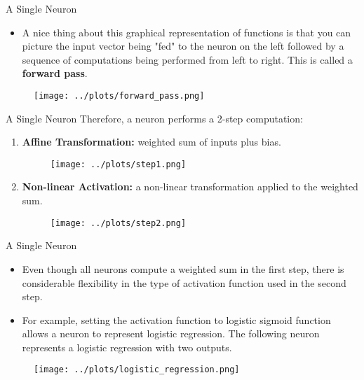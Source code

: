 \begin{vbframe} {A Single Neuron}
\begin{itemize}
\item A nice thing about this graphical representation of functions is that you can picture the input vector being "fed" to the neuron on the left followed by a sequence of computations being performed from left to right. This is called a \textbf{forward pass}.
\end{itemize}
\vspace{1cm}
\begin{figure}
\texttt{[image: ../plots/forward\_pass.png]}
\end{figure}
\end{vbframe}

\begin{frame} {A Single Neuron}
Therefore, a neuron performs a 2-step computation:
\begin{enumerate}
\item \textbf{Affine Transformation:} weighted sum of inputs plus bias.
\begin{figure}
\texttt{[image: ../plots/step1.png]}
\end{figure}
\item \textbf{Non-linear Activation:} a non-linear transformation applied to the weighted sum.
\begin{figure}
\texttt{[image: ../plots/step2.png]}
\end{figure}
\end{enumerate}
\end{frame}

\begin{vbframe} {A Single Neuron}
\begin{itemize}
\item Even though all neurons compute a weighted sum in the first step, there is considerable flexibility in the type of activation function used in the second step.
\item For example, setting the activation function to logistic sigmoid function allows a neuron to represent logistic regression. The following neuron represents a logistic regression with two outputs.
\end{itemize}
\begin{figure}
\texttt{[image: ../plots/logistic\_regression.png]}
\end{figure}
\end{vbframe}

